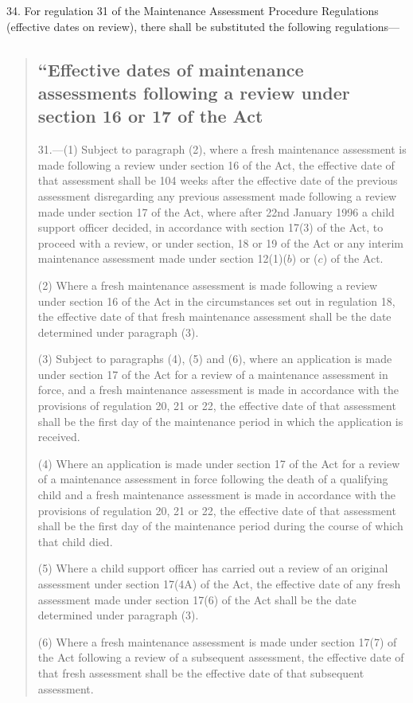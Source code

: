 \documentclass[12pt,a4paper]{article}
\begin{document}
34.  For regulation 31 of the Maintenance Assessment Procedure Regulations (effective dates on review), there shall be substituted the following regulations—
\begin{quotation}
\subsection*{“Effective dates of maintenance assessments following a review under section 16 or 17 of the Act}

31.—(1) Subject to paragraph (2), where a fresh maintenance assessment is made following a review under section 16 of the Act, the effective date of that assessment shall be 104 weeks after the effective date of the previous assessment disregarding any previous assessment made following a review made under section 17 of the Act, where after 22nd January 1996 a child support officer decided, in accordance with section 17(3) of the Act, to proceed with a review, or under section, 18 or 19 of the Act or any interim maintenance assessment made under section 12(1)($b$) or ($c$) of the Act.

(2) Where a fresh maintenance assessment is made following a review under section 16 of the Act in the circumstances set out in regulation 18, the effective date of that fresh maintenance assessment shall be the date determined under paragraph (3).

(3) Subject to paragraphs (4), (5) and (6), where an application is made under section 17 of the Act for a review of a maintenance assessment in force, and a fresh maintenance assessment is made in accordance with the provisions of regulation 20, 21 or 22, the effective date of that assessment shall be the first day of the maintenance period in which the application is received.

(4) Where an application is made under section 17 of the Act for a review of a maintenance assessment in force following the death of a qualifying child and a fresh maintenance assessment is made in accordance with the provisions of regulation 20, 21 or 22, the effective date of that assessment shall be the first day of the maintenance period during the course of which that child died.

(5) Where a child support officer has carried out a review of an original assessment under section 17(4A) of the Act, the effective date of any fresh assessment made under section 17(6) of the Act shall be the date determined under paragraph (3).

(6) Where a fresh maintenance assessment is made under section 17(7) of the Act following a review of a subsequent assessment, the effective date of that fresh assessment shall be the effective date of that subsequent assessment.


\end{quotation}
\end{document}
